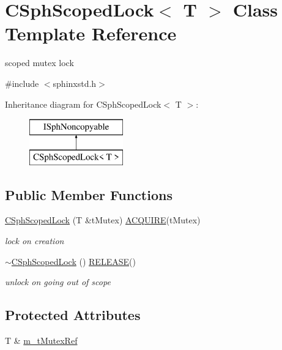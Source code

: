 \hypertarget{classCSphScopedLock}{\section{C\-Sph\-Scoped\-Lock$<$ T $>$ Class Template Reference}
\label{classCSphScopedLock}
}


scoped mutex lock  




{\ttfamily \#include $<$sphinxstd.\-h$>$}

Inheritance diagram for C\-Sph\-Scoped\-Lock$<$ T $>$\-:\begin{figure}[H]
\begin{center}
\leavevmode
\includegraphics[height=2.000000cm]{classCSphScopedLock}
\end{center}
\end{figure}
\subsection*{Public Member Functions}
\begin{DoxyCompactItemize}
\item 
\hyperlink{classCSphScopedLock_a2387ac24add15e0d74c41f6dc60796e1}{C\-Sph\-Scoped\-Lock} (T \&t\-Mutex) \hyperlink{sphinxstd_8h_aa826316eb51d0a47bf60521c39469bed}{A\-C\-Q\-U\-I\-R\-E}(t\-Mutex)
\begin{DoxyCompactList}\small\item\em lock on creation \end{DoxyCompactList}\item 
\hyperlink{classCSphScopedLock_a716132ff74aec7d0c004b876132fc5fe}{$\sim$\-C\-Sph\-Scoped\-Lock} () \hyperlink{sphinxstd_8h_a59a3415d4063936405dfca342973c2ea}{R\-E\-L\-E\-A\-S\-E}()
\begin{DoxyCompactList}\small\item\em unlock on going out of scope \end{DoxyCompactList}\end{DoxyCompactItemize}
\subsection*{Protected Attributes}
\begin{DoxyCompactItemize}
\item 
T \& \hyperlink{classCSphScopedLock_ab4f81a17e09f9ef2a3e520cf2c957806}{m\-\_\-t\-Mutex\-Ref}
\end{DoxyCompactItemize}


